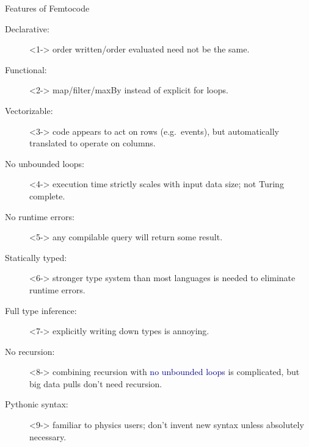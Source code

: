\documentclass{beamer}
\begin{document}
\begin{frame}{Features of Femtocode}
\vspace{0.5 cm}
\begin{description}
\item[Declarative:]<1-> order written/order evaluated need not be the same.
\item[Functional:]<2-> map/filter/maxBy instead of explicit for loops.
\item[Vectorizable:]<3-> code appears to act on rows (e.g.\ events), but automatically translated to operate on columns.
\item[No unbounded loops:]<4-> execution time strictly scales with input data size; not Turing complete.
\item[No runtime errors:]<5-> any compilable query will return some result.
\item[Statically typed:]<6-> stronger type system than most languages is needed to eliminate runtime errors.
\item[Full type inference:]<7-> explicitly writing down types is annoying.
\item[No recursion:]<8-> combining recursion with \textcolor{darkblue}{no unbounded loops} is complicated, but big data pulls don't need recursion.
\item[Pythonic syntax:]<9-> familiar to physics users; don't invent new syntax unless absolutely necessary.
\end{description}
\end{frame}
\end{document}
